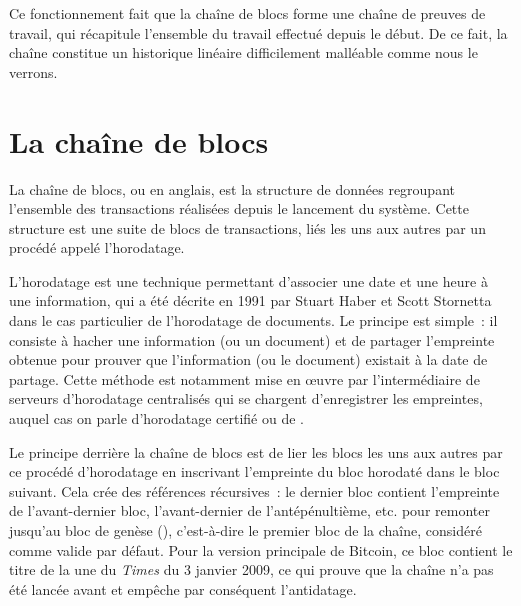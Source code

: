 Ce fonctionnement fait que la chaîne de blocs forme une chaîne de preuves de travail, qui récapitule l'ensemble du travail effectué depuis le début. De ce fait, la chaîne constitue un historique linéaire difficilement malléable comme nous le verrons.

\section*{La chaîne de blocs}

La chaîne de blocs, ou  en anglais, est la structure de données regroupant l'ensemble des transactions réalisées depuis le lancement du système. Cette structure est une suite de blocs de transactions, liés les uns aux autres par un procédé appelé l'horodatage.


L'horodatage est une technique permettant d'associer une date et une heure à une information, qui a été décrite en 1991 par Stuart Haber et Scott Stornetta dans le cas particulier de l'horodatage de documents. Le principe est simple~: il consiste à hacher une information (ou un document) et de partager l'empreinte obtenue pour prouver que l'information (ou le document) existait à la date de partage. Cette méthode est notamment mise en œuvre par l'intermédiaire de serveurs d'horodatage centralisés qui se chargent d'enregistrer les empreintes, auquel cas on parle d'horodatage certifié ou de .

Le principe derrière la chaîne de blocs est de lier les blocs les uns aux autres par ce procédé d'horodatage en inscrivant l'empreinte du bloc horodaté dans le bloc suivant. Cela crée des références récursives~: le dernier bloc contient l'empreinte de l'avant-dernier bloc, l'avant-dernier de l'antépénultième, etc. pour remonter jusqu'au bloc de genèse (), c'est-à-dire le premier bloc de la chaîne, considéré comme valide par défaut. Pour la version principale de Bitcoin, ce bloc contient le titre de la une du \emph{Times} du 3 janvier 2009, ce qui prouve que la chaîne n'a pas été lancée avant et empêche par conséquent l'antidatage.

